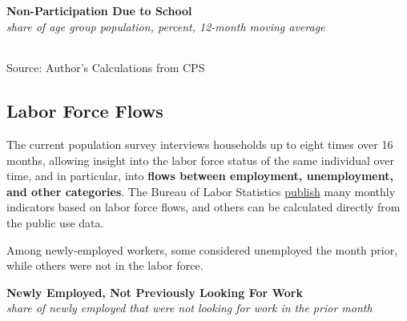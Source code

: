 \documentclass{report}
\makeatletter
\newcommand*\short[1]{\expandafter\@gobbletwo\number\numexpr#1\relax}
\newcommand{\dateaxisticks}{
		date coordinates in=x, axis line style={draw=none},
		xmax={2023-11-01},
		max space between ticks=40,	    
		xtick={{1990-01-01}, {1992-01-01}, {1994-01-01}, 
			{1996-01-01}, {1998-01-01}, {2000-01-01}, 
			{2002-01-01}, {2004-01-01}, {2006-01-01},
			{2008-01-01}, {2010-01-01}, {2012-01-01}, {2014-01-01},
		    {2016-01-01}, {2018-01-01}, {2020-01-01}, {2022-01-01}, 
		    {2024-01-01}, {2026-01-01}},
		minor xtick={{1989-01-01}, {1991-01-01}, {1993-01-01},
			{1995-01-01}, {1997-01-01}, {1999-01-01}, 
			{2001-01-01}, {2003-01-01}, {2005-01-01}, {2007-01-01},
		    {2009-01-01}, {2011-01-01}, {2013-01-01}, {2015-01-01},
		    {2017-01-01}, {2019-01-01}, {2021-01-01}, {2023-01-01}, 
		    {2025-01-01}, {2027-01-01}},
		enlarge y limits={0.06}, enlarge x limits={0.01},
		}
\newcommand{\bbar}[2]{extra #1 ticks = {{#2}}, extra #1 tick labels = ,
		extra #1 tick style = {grid=major, grid style={thick, black!25}},}
\newcommand{\stdline}[4]{\addplot[very thick, no markers, color=#1] 
		table [x=#2, y=#3, col sep=comma] {#4};	}
\newcommand{\thickline}[4]{\addplot[ultra thick, no markers, color=#1] 
		table [x=#2, y=#3, col sep=comma] {#4};	}
\newcommand{\rbars}{
		\fill[color=black!10] (axis cs:{1990-07-01},\pgfkeysvalueof{/pgfplots/ymin}) rectangle 
			(axis cs:{1991-03-01}, \pgfkeysvalueof{/pgfplots/ymax});
		\fill[color=black!10] (axis cs:{2007-12-01},\pgfkeysvalueof{/pgfplots/ymin}) rectangle 
			(axis cs:{2009-07-01}, \pgfkeysvalueof{/pgfplots/ymax});
		\fill[color=black!10] (axis cs:{2001-03-01},\pgfkeysvalueof{/pgfplots/ymin}) rectangle 
			(axis cs:{2001-11-01}, \pgfkeysvalueof{/pgfplots/ymax});
		\fill[color=black!10] (axis cs:{2020-02-01},\pgfkeysvalueof{/pgfplots/ymin}) rectangle 
			(axis cs:{2020-05-01}, \pgfkeysvalueof{/pgfplots/ymax});}
\makeatother
\begin{document}
{\begin{minipage}{0.76\textwidth}
\normalsize{\textbf{Non-Participation Due to School}}\\
\footnotesize{\textit{share of age group population, percent, 12-month moving average}}\\
\hspace*{-2mm} \noindent {} \setlength{\tabcolsep}{2.5pt} \color{black!90}
		{\renewcommand{\arraystretch}{1.58}
		 \begin{tabular}{p{22mm} R{10mm} R{10mm} R{10mm} R{10mm} R{10mm} 
		 	R{10mm} R{10mm} R{10mm}}
			  \hline
		\end{tabular}}
		
	\vspace{-1mm}
\footnotesize{Source: Author's Calculations from CPS} 
\end{minipage}
\newpage
\hypertarget{labf}{\label{labf}}
\begin{minipage}{0.76\textwidth}  
\subsection*{Labor Force Flows}
\small The current population survey interviews households up to eight times over 16 months, allowing insight into the labor force status of the same individual over time, and in particular, into \textbf{flows between employment, unemployment, and other categories}. The Bureau of Labor Statistics \href{https://www.bls.gov/cps/cps_flows.htm}{publish} many monthly indicators based on labor force flows, and others can be calculated directly from the public use data.

Among newly-employed workers, some considered unemployed the month prior, while others were not in the labor force.  
\vspace{2mm}

\normalsize \textbf{Newly Employed, Not Previously Looking For Work}\\
\footnotesize{\textit{share of newly employed that were not looking for work in the prior month}}
\vspace{3.8cm}

\hspace{3mm} 


\end{minipage}}
\end{document}

